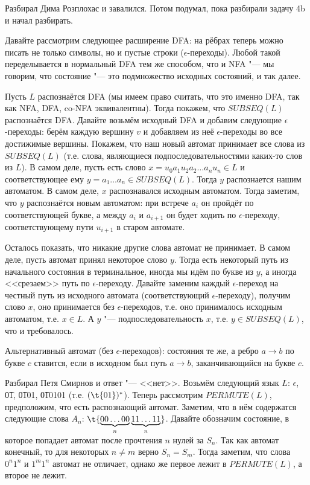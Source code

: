 	Разбирал Дима Розплохас и завалился.
	Потом подумал, пока разбирали задачу 4b и начал разбирать.

	Давайте рассмотрим следующее расширение DFA: на рёбрах теперь можно писать не только
	символы, но и пустые строки ($\epsilon$-переходы).
	Любой такой переделывается в нормальный DFA тем же способом, что и NFA "--- мы говорим,
	что состояние "--- это подмножество исходных состояний, и так далее.

	Пусть $L$ распознаётся DFA (мы имеем право считать, что это именно DFA, так как NFA, DFA, co-NFA эквивалентны).
	Тогда покажем, что $SUBSEQ(L)$ распознаётся DFA.
	Давайте возьмём исходный DFA и добавим следующие $\epsilon$-переходы:
	берём каждую вершину $v$ и добавляем из неё $\epsilon$-переходы во все достижимые вершины.
	Покажем, что наш новый автомат принимает все слова из $SUBSEQ(L)$
	(т.е. слова, являющиеся подпоследовательностями каких-то слов из $L$).
	В самом деле, пусть есть слово $x=u_0a_1u_2a_2\dots a_nu_n \in L$ и соответствующее
	ему $y = a_1\dots a_n \in SUBSEQ(L)$.
	Тогда $y$ распознается нашим автоматом.
	В самом деле, $x$ распознавался исходным автоматом.
	Тогда заметим, что $y$ распознаётся новым автоматом: при встрече $a_i$ он пройдёт по соответствующей букве,
	а между $a_i$ и $a_{i+1}$ он будет ходить по $\epsilon$-переходу, соответствующему пути $u_{i+1}$
	в старом автомате.

	Осталось показать, что никакие другие слова автомат не принимает.
	В самом деле, пусть автомат принял некоторое слово $y$.
	Тогда есть некоторый путь из начального состояния в терминальное, иногда мы идём по букве
	из $y$, а иногда <<срезаем>> путь по $\epsilon$-переходу.
	Давайте заменим каждый $\epsilon$-переход на честный путь из исходного автомата (соответствующий $\epsilon$-переходу),
	получим	слово $x$, оно принимается без $\epsilon$-переходов, т.е. оно принималось исходным автоматом, т.е. $x \in L$.
	А $y$ "--- подпоследовательность $x$, т.е. $y \in SUBSEQ(L)$, что и требовалось.

	\begin{Rem}
		Альтернативный автомат (без $\epsilon$-переходов): состояния те же,
		а ребро $a\to b$ по букве $c$ ставится, если в исходном был путь $a \to b$,
		заканчивающийся на букве $c$.
	\end{Rem}

	Разбирал Петя Смирнов и ответ "--- <<нет>>.
	Возьмём следующий язык $L$: $\epsilon$, \t{01}, \t{0101}, \t{010101} (т.е. $(\t{01})^*$).
	Теперь рассмотрим $PERMUTE(L)$, предположим, что есть распознающий автомат.
	Заметим, что в нём содержатся следующие слова $A_n$: $\t{\underbrace{00\dots00}_{n}\underbrace{11\dots11}_{n}}$.
	Давайте обозначим состояние, в которое попадает автомат после прочтения $n$ нулей за $S_n$.
	Так как автомат конечный, то для некоторых $n \neq m$ верно $S_n=S_m$.
	Тогда заметим, что слова $0^n1^n$ и $1^m1^n$ автомат не отличает, однако же первое лежит в $PERMUTE(L)$,
	а второе не лежит.

